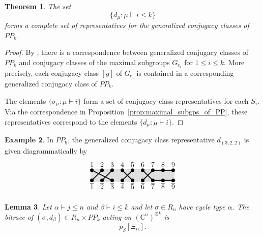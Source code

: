\documentclass{amsart}
\newtheorem{lemma}{Lemma}[section]
\newtheorem{theorem}[lemma]{Theorem}
\theoremstyle{definition}
\newtheorem{example}[lemma]{Example}
\newcommand{\C}{\mathbb{C}}
\newcommand{\PP}{P\!P}
\newcommand{\ov}[1]{\overline{#1}}
\begin{document}
\begin{theorem}
	The set \[\{d_\mu:\mu\vdash i\leq k\}\] forms a complete set of representatives for the generalized conjugacy classes of $\PP_k$.
\end{theorem}

\begin{proof}
	By \cite[Proposition 7.4]{steinberg}, there is a correspondence between generalized
	conjugacy classes of $\PP_k$ and conjugacy classes of the maximal subgroups $G_{e_i}$ for $1\leq i\leq k$.
	More precisely, each conjugacy class $[g]$ of $G_{e_i}$ is contained in a
	corresponding generalized conjugacy class of $\PP_k$.

	The elements $\{\sigma_\mu:\mu\vdash i\}$ form a set of conjugacy class representatives for each $S_i$.
	Via the correspondence in Proposition~\ref{prop:maximal_subgps_of_PP}, these representatives correspond
	to the elements $\{d_\mu:\mu\vdash i\}$.
\end{proof}

\begin{example}
	In $\PP_9$, the generalized conjugacy class representative $d_{(3,2,2)}$ is given diagrammatically by \[
	\begin{tikzpicture}[xscale=.5,yscale=.5,line width=1.25pt] 
                \foreach \i in {1,...,9}  { \path (\i,1.25) coordinate (T\i); \path(\i,1.8) node {$\i$}; \path (\i,.25) coordinate (B\i); \path(\i,-.3) node {$\ov{\i}$}; } 
                \filldraw[fill= black!12,draw=black!12,line width=4pt]  (T1) -- (T9) -- (B9) -- (B1) -- (T1);
                \draw[black] (T1)--(B3);
                \draw[black] (T2)--(B1);
                \draw[black] (T3)--(B2);
                \draw[black] (T4)--(B5);
                \draw[black] (T5)--(B4);
                \draw[black] (T6)--(B7)--(B9);
                \draw[black] (B6)--(T7)--(T9);
                \foreach \i in {1,...,9}  {\filldraw[fill=black,draw=black,line width = 1pt] (T\i) circle (4pt);
                			     \filldraw[fill=black,draw=black,line width = 1pt] (B\i) circle (4pt);}
       \end{tikzpicture}\]
\end{example}


\begin{lemma}\label{lem:bitrace_computation}
	Let $\alpha\vdash j\leq n$ and $\beta\vdash i\leq k$ and let $\sigma\in R_n$ have cycle type $\alpha$.
	The bitrace of $(\sigma,d_\beta)\in R_n\times\PP_k$ acting on $\left(\C^n\right)^{\otimes k}$ is \[p_\beta[\Xi_\alpha].\]
\end{lemma}
\end{document}
